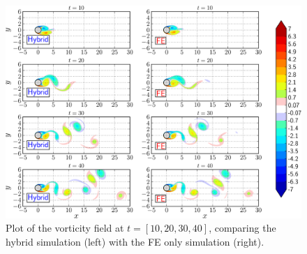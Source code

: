 	\begin{figure}[!p]
	\centering
	\includegraphics[width=\linewidth]{./figures/validation/isc/hybrid_cylinder_LongRun_contourfComparison-crop_fixed.png}
	\caption{Plot of the vorticity field at $t=[10,20,30,40]$, comparing the hybrid simulation (left) with the FE only simulation (right).}
	\label{fig:hybrid_cylinder_LongRun_contourfComparison}
	\end{figure}
	
